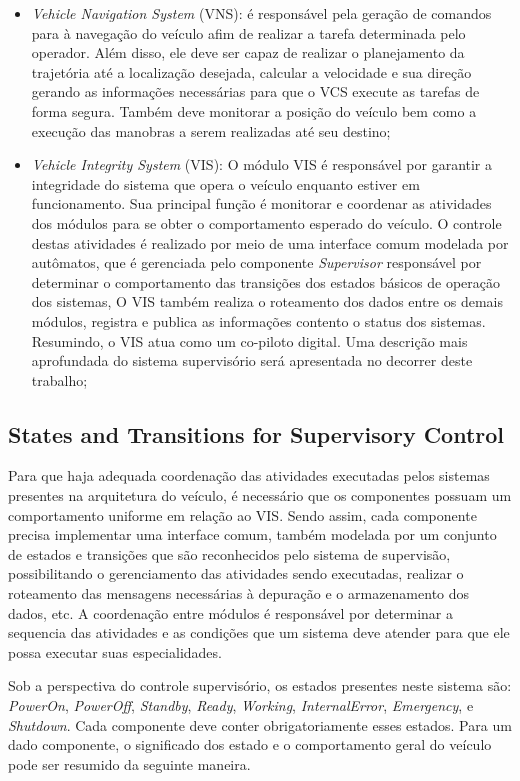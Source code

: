 \documentclass[conference]{IEEEtran}
\begin{document}
\begin{itemize}
	\item \textit{Vehicle Navigation System} (VNS): é responsável pela geração de comandos para à navegação do veículo afim de realizar a tarefa determinada pelo operador. Além disso, ele deve ser capaz de realizar o planejamento da trajetória até a localização desejada, calcular a velocidade e sua direção gerando as informações necessárias para que o VCS execute as tarefas de forma segura. Também deve	monitorar a posição do veículo bem como a execução das manobras a serem realizadas até seu destino;
	
	\item \textit{Vehicle Integrity System} (VIS): O módulo VIS é responsável por garantir a integridade do sistema que opera o veículo enquanto estiver em funcionamento. Sua principal função é monitorar e coordenar as atividades dos módulos para se obter o comportamento esperado do veículo. O controle destas atividades é realizado por meio de uma interface comum modelada por autômatos, que é gerenciada pelo componente \textit{Supervisor} responsável por determinar o comportamento das transições dos estados básicos de operação dos sistemas, O VIS também realiza o roteamento dos dados entre os demais módulos, registra e publica as informações contento o status dos sistemas. Resumindo, o VIS atua como um co-piloto digital. Uma descrição mais aprofundada do sistema supervisório será apresentada no decorrer deste trabalho;
\end{itemize}
%
\subsection{States and Transitions for Supervisory Control}\label{subsec:states_transitions}

Para que haja adequada coordenação das atividades executadas pelos sistemas presentes na arquitetura do veículo, é necessário que os componentes possuam um comportamento uniforme em relação ao VIS. Sendo assim, cada componente precisa implementar uma interface comum, também modelada por um conjunto de estados e transições que são reconhecidos pelo sistema de supervisão, possibilitando o gerenciamento das atividades sendo executadas, realizar o roteamento das mensagens necessárias à depuração e o armazenamento dos dados, etc. A coordenação entre módulos é responsável por determinar a sequencia das atividades e as condições que um sistema deve atender para que ele possa executar suas especialidades.

Sob a perspectiva do controle supervisório, os estados presentes neste sistema são: \textit{PowerOn}, \textit{PowerOff}, \textit{Standby}, \textit{Ready}, \textit{Working}, \textit{InternalError}, \textit{Emergency}, e \textit{Shutdown}.
Cada componente deve conter obrigatoriamente esses estados. Para um dado componente, o significado dos estado e o comportamento geral do veículo pode ser resumido da seguinte maneira.
\end{document}
